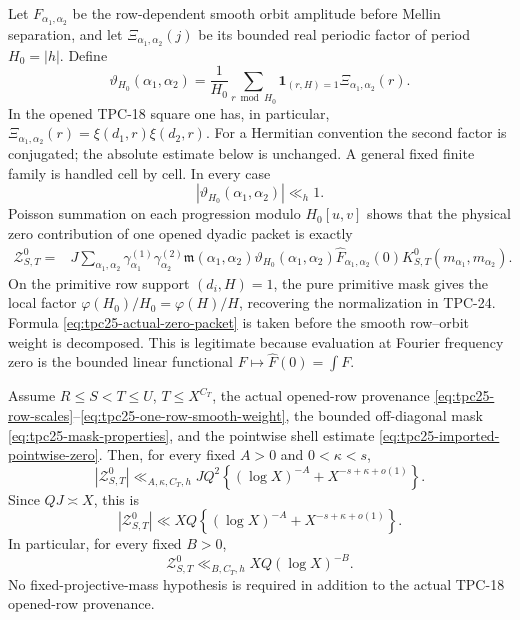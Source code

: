 Let \(F_{\alpha_1,\alpha_2}\) be the row-dependent smooth orbit
amplitude before Mellin separation, and let
\(\Xi_{\alpha_1,\alpha_2}(j)\) be its bounded real periodic factor of
period \(H_0=|h|\).  Define
\begin{equation}
 \vartheta_{H_0}(\alpha_1,\alpha_2)
 =\frac1{H_0}\sum_{r\bmod H_0}
 \mathbf 1_{(r,H)=1}
 \Xi_{\alpha_1,\alpha_2}(r).
 \label{eq:tpc25-local-zero-factor}
\end{equation}
In the opened TPC-18 square one has, in particular,
\(\Xi_{\alpha_1,\alpha_2}(r)=\xi(d_1,r)\xi(d_2,r)\).
For a Hermitian convention the second factor is conjugated; the
absolute estimate below is unchanged.  A general fixed finite family
is handled cell by cell.  In every case
\begin{equation}
 |\vartheta_{H_0}(\alpha_1,\alpha_2)|\ll_h1.
 \label{eq:tpc25-local-zero-bound}
\end{equation}
Poisson summation on each progression modulo \(H_0[u,v]\) shows that the
physical zero contribution of one opened dyadic packet is exactly
\begin{align}
 \mathcal Z^0_{S,T}
 ={}&J
 \sum_{\alpha_1,\alpha_2}
 \gamma^{(1)}_{\alpha_1}\gamma^{(2)}_{\alpha_2}
 \mathfrak m(\alpha_1,\alpha_2)
 \vartheta_{H_0}(\alpha_1,\alpha_2)
 \widehat F_{\alpha_1,\alpha_2}(0)
 K^0_{S,T}(m_{\alpha_1},m_{\alpha_2}).
 \label{eq:tpc25-actual-zero-packet}
\end{align}
On the primitive row support \((d_i,H)=1\), the pure primitive mask
gives the local factor
\(\varphi(H_0)/H_0=\varphi(H)/H\), recovering the normalization in
TPC-24.  Formula \eqref{eq:tpc25-actual-zero-packet}
is taken before the smooth row--orbit weight is decomposed.  This is
legitimate because evaluation at Fourier frequency zero is the bounded
linear functional \(F\mapsto\widehat F(0)=\int F\).

\begin{theorem}
\label{thm:tpc25-zero-before-separation}
Assume \(R\le S<T\le U\), \(T\le X^{C_T}\), the actual opened-row provenance
\eqref{eq:tpc25-row-scales}--\eqref{eq:tpc25-one-row-smooth-weight},
the bounded off-diagonal mask \eqref{eq:tpc25-mask-properties}, and the
pointwise shell estimate \eqref{eq:tpc25-imported-pointwise-zero}.
Then, for every fixed \(A>0\) and \(0<\kappa<s\),
\begin{equation}
 \boxed{
 |\mathcal Z^0_{S,T}|
 \ll_{A,\kappa,C_T,h}
 JQ^2\left\{(\log X)^{-A}
 +X^{-s+\kappa+o(1)}\right\}.}
 \label{eq:tpc25-zero-first-bound}
\end{equation}
Since \(QJ\asymp X\), this is
\begin{equation}
 |\mathcal Z^0_{S,T}|
 \ll XQ\left\{(\log X)^{-A}
 +X^{-s+\kappa+o(1)}\right\}.
 \label{eq:tpc25-zero-first-natural-scale}
\end{equation}
In particular, for every fixed \(B>0\),
\begin{equation}
 \boxed{\mathcal Z^0_{S,T}
 \ll_{B,C_T,h}XQ(\log X)^{-B}.}
 \label{eq:tpc25-zero-first-log-closure}
\end{equation}
No fixed-projective-mass hypothesis is required in addition to the
actual TPC-18 opened-row provenance.
\end{theorem}

